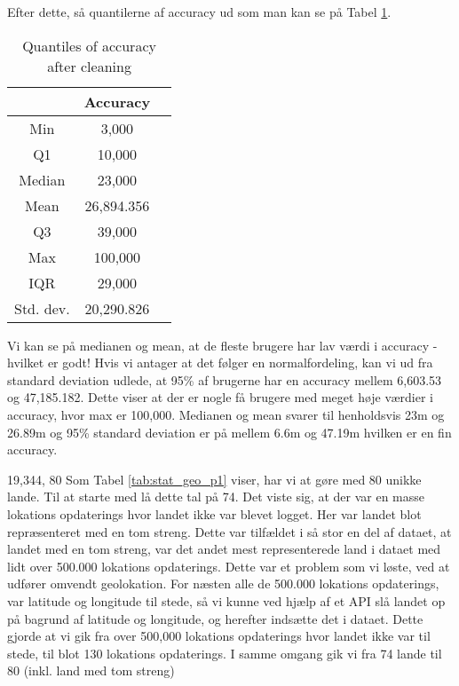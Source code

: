 Efter dette, så quantilerne af accuracy ud som man kan se på Tabel \ref{tab:acc_quantiles}. 
 \begin{table}[htbp]
        \centering
        \small
        \setlength\tabcolsep{2pt}
        \begin{tabular}{|c|c|c|}
            \hline
                         & Accuracy      \\[-1pt]
            \hline
                 Min &  3,000       \\
            \hline
                 Q1      &  10,000   \\
            \hline
                 Median  &  23,000    \\
            \hline
                 Mean    &  26,894.356    \\
            \hline
                 Q3      &  39,000      \\
            \hline
                 Max &  100,000   \\
            \hline
                 IQR     &   29,000     \\
            \hline
                Std. dev.  &  20,290.826   \\
            \hline
        \end{tabular}
        \caption{Quantiles of accuracy after cleaning} %
        \label{tab:acc_quantiles}
\end{table}

Vi kan se på medianen og mean, at de fleste brugere har lav værdi i accuracy - hvilket er godt! Hvis vi antager at det følger en normalfordeling, kan vi ud fra standard deviation udlede, at 95\% af brugerne har en accuracy mellem 6,603.53 og 47,185.182. Dette viser at der er nogle få brugere med meget høje værdier i accuracy, hvor max er 100,000. Medianen og mean svarer til henholdsvis 23m og 26.89m og 95\% standard deviation er på mellem 6.6m og 47.19m hvilken er en fin accuracy. 

 19,344,  80 
Som Tabel \ref{tab:stat_geo_p1} viser, har vi at gøre med 80 unikke lande. Til at starte med lå dette tal på 74. Det viste sig, at der var en masse lokations opdaterings hvor landet ikke var blevet logget. Her var landet blot repræsenteret med en tom streng. Dette var tilfældet i så stor en del af dataet, at landet med en tom streng, var det andet mest representerede land i dataet med lidt over 500.000 lokations opdaterings. 
Dette var et problem som vi løste, ved at udfører omvendt geolokation. For næsten alle de 500.000 lokations opdaterings, var latitude og longitude til stede, så vi kunne ved hjælp af et API\cite{reversegeocode} slå landet op på bagrund af latitude og longitude, og herefter indsætte det i dataet. 
Dette gjorde at vi gik fra over 500,000 lokations opdaterings hvor landet ikke var til stede, til blot 130 lokations opdaterings. I samme omgang gik vi fra 74 lande til 80 (inkl. land med tom streng)

